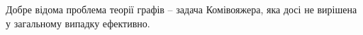 Добре відома проблема теорії графів -- задача Комівояжера, яка досі 
не вирішена у загальному випадку ефективно.